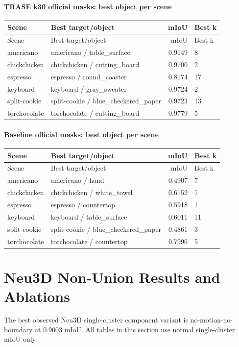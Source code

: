 \documentclass[10pt]{article}
\begin{document}
\paragraph{TRASE k30 official masks: best object per scene}
\small
\begin{longtable}{llrl}
\toprule
Scene & Best target/object & mIoU & Best k \\
\midrule
\endfirsthead
\toprule
Scene & Best target/object & mIoU & Best k \\
\midrule
\endhead
americano & americano / table\_surface & 0.9149 & 8 \\
chickchicken & chickchicken / cutting\_board & 0.9700 & 2 \\
espresso & espresso / round\_coaster & 0.8174 & 17 \\
keyboard & keyboard / gray\_sweater & 0.9724 & 2 \\
split-cookie & split-cookie / blue\_checkered\_paper & 0.9723 & 13 \\
torchocolate & torchocolate / cutting\_board & 0.9779 & 5 \\
\bottomrule
\end{longtable}
\normalsize

\paragraph{Baseline official masks: best object per scene}
\small
\begin{longtable}{llrl}
\toprule
Scene & Best target/object & mIoU & Best k \\
\midrule
\endfirsthead
\toprule
Scene & Best target/object & mIoU & Best k \\
\midrule
\endhead
americano & americano / hand & 0.4907 & 7 \\
chickchicken & chickchicken / white\_towel & 0.6152 & 7 \\
espresso & espresso / countertop & 0.5918 & 1 \\
keyboard & keyboard / table\_surface & 0.6011 & 11 \\
split-cookie & split-cookie / blue\_checkered\_paper & 0.4861 & 3 \\
torchocolate & torchocolate / countertop & 0.7996 & 5 \\
\bottomrule
\end{longtable}
\normalsize

\section{Neu3D Non-Union Results and Ablations}
The best observed Neu3D single-cluster component variant is no-motion-no-boundary at 0.9003 mIoU.  All tables in this section use normal single-cluster mIoU only.
\end{document}
